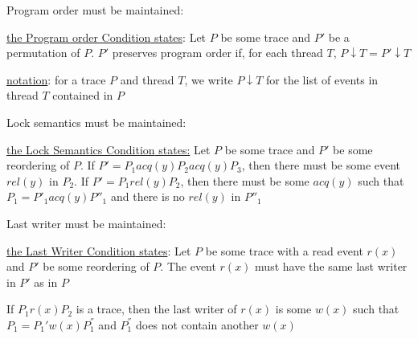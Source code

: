 \documentclass[landscape, a4paper]{article}
\begin{document}
\begin{minipage}[t]{0.2\linewidth}
\begin{betterlist}
\begin{enumerate}
			\item \alert{Program order must be maintained}:
				\item {}
			\end{betterlist}
			\item \alert{Lock semantics must be maintained}:
			\begin{betterlist}
				\item \underline{the \alert{Lock Semantics Condition} states:} Let $P$ be some trace and $P'$ be some reordering of $P$. If $𝑃' = P_1 acq(y) P_2 acq(y) P_3$, then there must be some event $rel(y)$ in $P_2$. If $P' = P_1 rel(y) P_2$, then there must be some $acq(y)$ such that $P_1 = P'_1 acq(y) P''_1$ and there is no $rel(y)$ in $𝑃''_1$
				\item \script{87}{Example}
			\end{betterlist}
			\item \alert{Last writer must be maintained}:
			\begin{betterlist}
				\item \underline{the \alert{Last Writer Condition} states}: Let $P$ be some trace with a read event $r(x)$ and $P'$ be some reordering of $P$. The event $r(x)$ must have the same \alert{last writer} in $P'$ as in $P$
				\begin{betterlist}
					\item If $P_1 r(𝑥) P_2$ is a trace, then the \alert{last writer} of $r(x)$ is some $w(x)$ such that $P_1 = P_1' w(x) P_1^{''}$ and $P_1^{''}$ does not contain another $w(x)$
				\end{betterlist}


\end{betterlist}
\end{enumerate}
\end{betterlist}
\end{minipage}
\end{document}
